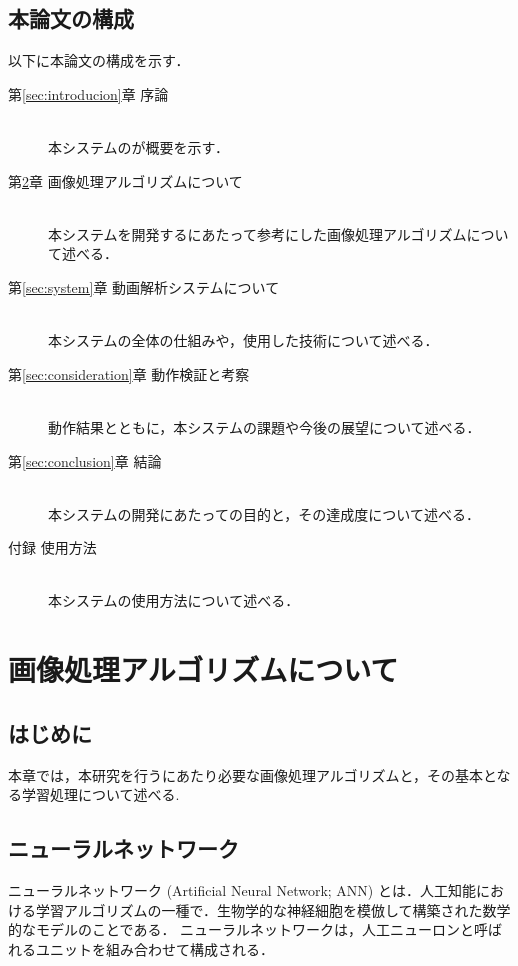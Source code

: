 \documentclass[a4j,12pt,dvipdfmx]{jreport}
\begin{document}
\clearpage

\section{本論文の構成}
以下に本論文の構成を示す．
\begin{description}
\item[第\ref{sec:introducion}章 \qquad 序論]\mbox{}\\
本システムのが概要を示す．

\item[第\ref{sec:algorithm}章 \qquad 画像処理アルゴリズムについて]\mbox{}\\
本システムを開発するにあたって参考にした画像処理アルゴリズムについて述べる．

\item[第\ref{sec:system}章 \qquad 動画解析システムについて]\mbox{}\\
本システムの全体の仕組みや，使用した技術について述べる．

\item[第\ref{sec:consideration}章 \qquad 動作検証と考察]\mbox{}\\
動作結果とともに，本システムの課題や今後の展望について述べる．

\item[第\ref{sec:conclusion}章 \qquad 結論]\mbox{}\\
本システムの開発にあたっての目的と，その達成度について述べる．

\item[付録 \qquad 使用方法]\mbox{}\\
本システムの使用方法について述べる．
\end{description}

\clearpage

\chapter{画像処理アルゴリズムについて}
\label{sec:algorithm}

\section{はじめに}
本章では，本研究を行うにあたり必要な画像処理アルゴリズムと，その基本となる学習処理について述べる.

\section{ニューラルネットワーク}
ニューラルネットワーク (Artificial Neural Network; ANN) とは．人工知能における学習アルゴリズムの一種で．生物学的な神経細胞を模倣して構築された数学的なモデルのことである．
ニューラルネットワークは，人工ニューロンと呼ばれるユニットを組み合わせて構成される．
\end{document}
